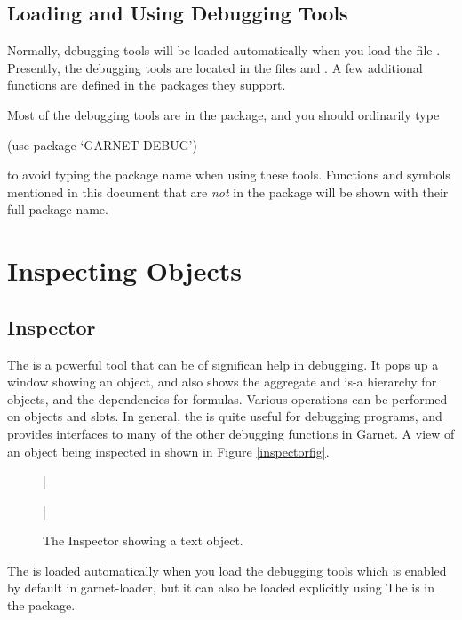 \section{Loading and Using Debugging Tools}
Normally, debugging tools will be loaded automatically when you load
the file .  Presently, the debugging tools are
located in the files  and .  A
few additional functions are defined in the packages they support.

Most of the debugging tools are in the  package,
and you should ordinarily type
\begin{programexample}
(use-package `GARNET-DEBUG')
\end{programexample}
to avoid typing the package name when using these tools.  Functions
and symbols mentioned in this document that are {\it not} in the
 package will be shown with their full package name.

\chapter{Inspecting Objects}

\section{Inspector}
\label{inspectorsec}
The  is a powerful tool that can be of significan help in
debugging.  It pops up a window showing an object, and also
shows the aggregate and is-a hierarchy for objects, and the
dependencies for formulas.  Various operations can be performed on
objects and slots.  In general, the  is quite useful for
debugging programs, and provides interfaces to many of the other
debugging functions in Garnet.  A view of an object being inspected in
shown in Figure \ref{inspectorfig}.

\begin{figure}
\bar{}
\begin{center}
\end{center}
\caption{The Inspector showing a text object.}
\bar{}
\end{figure}

The  is loaded automatically when you load the debugging
tools which is enabled by default in garnet-loader, but it can
also be loaded explicitly using 
The  is in the  package.

